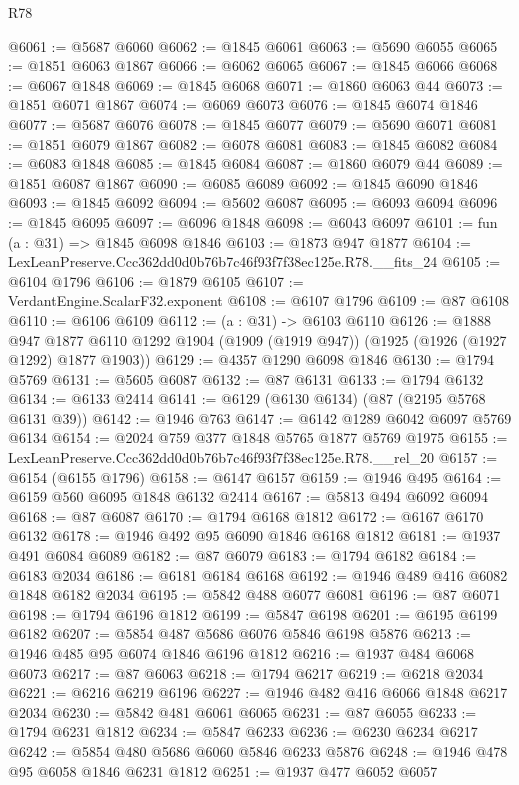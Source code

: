 \begin{lexlean}{R78}
\begin{coremodule}
@6061 := @5687 @6060
@6062 := @1845 @6061
@6063 := @5690 @6055
@6065 := @1851 @6063 @1867
@6066 := @6062 @6065
@6067 := @1845 @6066
@6068 := @6067 @1848
@6069 := @1845 @6068
@6071 := @1860 @6063 @44
@6073 := @1851 @6071 @1867
@6074 := @6069 @6073
@6076 := @1845 @6074 @1846
@6077 := @5687 @6076
@6078 := @1845 @6077
@6079 := @5690 @6071
@6081 := @1851 @6079 @1867
@6082 := @6078 @6081
@6083 := @1845 @6082
@6084 := @6083 @1848
@6085 := @1845 @6084
@6087 := @1860 @6079 @44
@6089 := @1851 @6087 @1867
@6090 := @6085 @6089
@6092 := @1845 @6090 @1846
@6093 := @1845 @6092
@6094 := @5602 @6087
@6095 := @6093 @6094
@6096 := @1845 @6095
@6097 := @6096 @1848
@6098 := @6043 @6097
@6101 := fun (a : @31) => @1845 @6098 @1846
@6103 := @1873 @947 @1877
@6104 := LexLeanPreserve.Ccc362dd0d0b76b7c46f93f7f38ec125e.R78.__fits_24
@6105 := @6104 @1796
@6106 := @1879 @6105
@6107 := VerdantEngine.ScalarF32.exponent
@6108 := @6107 @1796
@6109 := @87 @6108
@6110 := @6106 @6109
@6112 := (a : @31) -> @6103 @6110
@6126 := @1888
    @947
    @1877
    @6110
    @1292
    @1904
    (@1909 (@1919 @947))
    (@1925 (@1926 (@1927 @1292) @1877 @1903))
@6129 := @4357 @1290 @6098 @1846
@6130 := @1794 @5769
@6131 := @5605 @6087
@6132 := @87 @6131
@6133 := @1794 @6132
@6134 := @6133 @2414
@6141 := @6129 (@6130 @6134) (@87 (@2195 @5768 @6131 @39))
@6142 := @1946 @763
@6147 := @6142 @1289 @6042 @6097 @5769 @6134
@6154 := @2024 @759 @377 @1848 @5765 @1877 @5769 @1975
@6155 := LexLeanPreserve.Ccc362dd0d0b76b7c46f93f7f38ec125e.R78.__rel_20
@6157 := @6154 (@6155 @1796)
@6158 := @6147 @6157
@6159 := @1946 @495
@6164 := @6159 @560 @6095 @1848 @6132 @2414
@6167 := @5813 @494 @6092 @6094
@6168 := @87 @6087
@6170 := @1794 @6168 @1812
@6172 := @6167 @6170 @6132
@6178 := @1946 @492 @95 @6090 @1846 @6168 @1812
@6181 := @1937 @491 @6084 @6089
@6182 := @87 @6079
@6183 := @1794 @6182
@6184 := @6183 @2034
@6186 := @6181 @6184 @6168
@6192 := @1946 @489 @416 @6082 @1848 @6182 @2034
@6195 := @5842 @488 @6077 @6081
@6196 := @87 @6071
@6198 := @1794 @6196 @1812
@6199 := @5847 @6198
@6201 := @6195 @6199 @6182
@6207 := @5854 @487 @5686 @6076 @5846 @6198 @5876
@6213 := @1946 @485 @95 @6074 @1846 @6196 @1812
@6216 := @1937 @484 @6068 @6073
@6217 := @87 @6063
@6218 := @1794 @6217
@6219 := @6218 @2034
@6221 := @6216 @6219 @6196
@6227 := @1946 @482 @416 @6066 @1848 @6217 @2034
@6230 := @5842 @481 @6061 @6065
@6231 := @87 @6055
@6233 := @1794 @6231 @1812
@6234 := @5847 @6233
@6236 := @6230 @6234 @6217
@6242 := @5854 @480 @5686 @6060 @5846 @6233 @5876
@6248 := @1946 @478 @95 @6058 @1846 @6231 @1812
@6251 := @1937 @477 @6052 @6057

\end{coremodule}
\end{lexlean}

